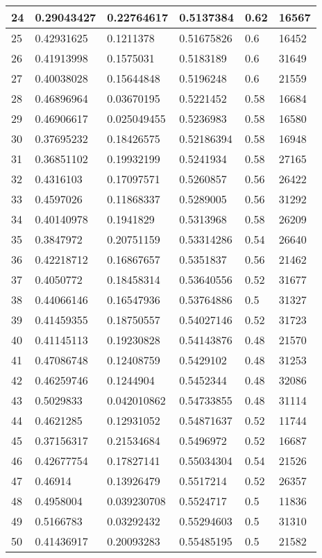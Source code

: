 \begin{longtable}{|l|l|l|l|l|l|}
24 & 0.29043427 & 0.22764617 & 0.5137384 & 0.62 & 16567 \\ \hline 
25 & 0.42931625 & 0.1211378 & 0.51675826 & 0.6 & 16452 \\ \hline 
26 & 0.41913998 & 0.1575031 & 0.5183189 & 0.6 & 31649 \\ \hline 
27 & 0.40038028 & 0.15644848 & 0.5196248 & 0.6 & 21559 \\ \hline 
28 & 0.46896964 & 0.03670195 & 0.5221452 & 0.58 & 16684 \\ \hline 
29 & 0.46906617 & 0.025049455 & 0.5236983 & 0.58 & 16580 \\ \hline 
30 & 0.37695232 & 0.18426575 & 0.52186394 & 0.58 & 16948 \\ \hline 
31 & 0.36851102 & 0.19932199 & 0.5241934 & 0.58 & 27165 \\ \hline 
32 & 0.4316103 & 0.17097571 & 0.5260857 & 0.56 & 26422 \\ \hline 
33 & 0.4597026 & 0.11868337 & 0.5289005 & 0.56 & 31292 \\ \hline 
34 & 0.40140978 & 0.1941829 & 0.5313968 & 0.58 & 26209 \\ \hline 
35 & 0.3847972 & 0.20751159 & 0.53314286 & 0.54 & 26640 \\ \hline 
36 & 0.42218712 & 0.16867657 & 0.5351837 & 0.56 & 21462 \\ \hline 
37 & 0.4050772 & 0.18458314 & 0.53640556 & 0.52 & 31677 \\ \hline 
38 & 0.44066146 & 0.16547936 & 0.53764886 & 0.5 & 31327 \\ \hline 
39 & 0.41459355 & 0.18750557 & 0.54027146 & 0.52 & 31723 \\ \hline 
40 & 0.41145113 & 0.19230828 & 0.54143876 & 0.48 & 21570 \\ \hline 
41 & 0.47086748 & 0.12408759 & 0.5429102 & 0.48 & 31253 \\ \hline 
42 & 0.46259746 & 0.1244904 & 0.5452344 & 0.48 & 32086 \\ \hline 
43 & 0.5029833 & 0.042010862 & 0.54733855 & 0.48 & 31114 \\ \hline 
44 & 0.4621285 & 0.12931052 & 0.54871637 & 0.52 & 11744 \\ \hline 
45 & 0.37156317 & 0.21534684 & 0.5496972 & 0.52 & 16687 \\ \hline 
46 & 0.42677754 & 0.17827141 & 0.55034304 & 0.54 & 21526 \\ \hline 
47 & 0.46914 & 0.13926479 & 0.5517214 & 0.52 & 26357 \\ \hline 
48 & 0.4958004 & 0.039230708 & 0.5524717 & 0.5 & 11836 \\ \hline 
49 & 0.5166783 & 0.03292432 & 0.55294603 & 0.5 & 31310 \\ \hline 
50 & 0.41436917 & 0.20093283 & 0.55485195 & 0.5 & 21582 \\ \hline 
\end{longtable}